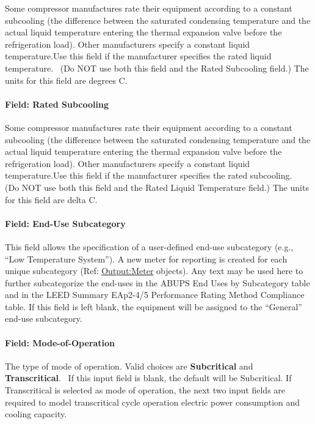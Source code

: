 Some compressor manufactures rate their equipment according to a constant subcooling (the difference between the saturated condensing temperature and the actual liquid temperature entering the thermal expansion valve before the refrigeration load). Other manufacturers specify a constant liquid temperature.Use this field if the manufacturer specifies the rated liquid temperature.~ (Do NOT use both this field and the Rated Subcooling field.) The units for this field are degrees C.

\paragraph{Field: Rated Subcooling}\label{field-rated-subcooling}

Some compressor manufactures rate their equipment according to a constant subcooling (the difference between the saturated condensing temperature and the actual liquid temperature entering the thermal expansion valve before the refrigeration load). Other manufacturers specify a constant liquid temperature.Use this field if the manufacturer specifies the rated subcooling.~ (Do NOT use both this field and the Rated Liquid Temperature field.) The units for this field are delta C.

\paragraph{Field: End-Use Subcategory}\label{field-end-use-subcategory-3-001}

This field allows the specification of a user-defined end-use subcategory (e.g., ``Low Temperature System''). A new meter for reporting is created for each unique subcategory (Ref: \hyperref[outputmeter-and-outputmetermeterfileonly]{Output:Meter} objects). Any text may be used here to further subcategorize the end-uses in the ABUPS End Uses by Subcategory table and in the LEED Summary EAp2-4/5 Performance Rating Method Compliance table.  If this field is left blank, the equipment will be assigned to the ``General'' end-use subcategory.

\paragraph{Field: Mode-of-Operation}\label{field-mode-of-operation}

The type of mode of operation. Valid choices are \textbf{Subcritical} and \textbf{Transcritical}.~ If this input field is blank, the default will be Subcritical. If Transcritical is selected as mode of operation, the next two input fields are required to model transcritical cycle operation electric power consumption and cooling capacity.

